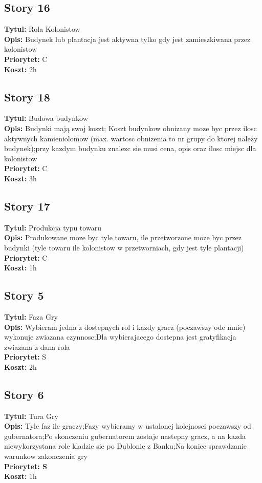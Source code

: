 \documentclass[12pt]{article}
\begin{document}
\subsection{Story 16}
\textbf{Tytul:} Rola Kolonistow  \\
\textbf{Opis:} Budynek lub plantacja jest aktywna tylko gdy jest zamieszkiwana
  przez kolonistow \\
\textbf{Priorytet:} C \\
\textbf{Koszt:} 2h \\

\subsection{Story 18 }
\textbf{Tytul:} Budowa budynkow \\
\textbf{Opis:}  Budynki mają swoj koszt; Koszt budynkow obnizany moze byc przez
ilosc aktywnych kamieniolomow (max. wartosc obnizenia to nr grupy do ktorej
nalezy budynek);przy kazdym budynku znalezc sie musi cena, opis oraz ilosc
miejsc dla kolonistow\\
\textbf{Priorytet:} C \\
\textbf{Koszt:} 3h \\

\subsection{Story 17}
\textbf{Tytul:} Produkcja typu towaru \\
\textbf{Opis:} Produkowane moze byc tyle towaru, ile przetworzone moze byc przez
budynki (tyle towaru ile kolonistow w przetworniach, gdy jest tyle plantacji)\\
\textbf{Priorytet:} C \\
\textbf{Koszt:} 1h \\

\subsection{Story 5}
\textbf{Tytul:} Faza Gry \\
\textbf{Opis:} Wybieram jedna z dostepnych rol i kazdy gracz (poczawszy ode
mnie) wykonuje zwiazana czynnosc;Dla wybierajacego dostepna jest
gratyfikacja zwiazana z dana rola \\
\textbf{Priorytet:} S \\
\textbf{Koszt:} 2h \\

\subsection{Story 6}
\textbf{Tytul:} Tura Gry \\
\textbf{Opis:} Tyle faz ile graczy;Fazy wybieramy w ustalonej kolejnosci
poczawszy od gubernatora;Po skonczeniu gubernatorem zostaje nastepny gracz, a na
kazda niewykorzystana role kladzie sie po Dublonie z Banku;Na koniec sprawdzanie
warunkow zakonczenia gry\\
\textbf{Priorytet: S}  \\
\textbf{Koszt:} 1h \\
\end{document}
